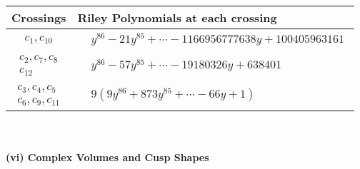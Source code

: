 \documentclass[1p]{elsarticle_modified}
\theoremstyle{definition}
\begin{document}
\begin{tabular}{m{50pt}|m{274pt}}
Crossings & \hspace{64pt}Riley Polynomials at each crossing \\
\hline $$\begin{aligned}c_{1},c_{10}\end{aligned}$$&$\begin{aligned}
&y^{86}-21 y^{85}+\cdots-1166956777638 y+100405963161
\end{aligned}$\\
\hline $$\begin{aligned}c_{2},c_{7},c_{8}\\c_{12}\end{aligned}$$&$\begin{aligned}
&y^{86}-57 y^{85}+\cdots-19180326 y+638401
\end{aligned}$\\
\hline $$\begin{aligned}c_{3},c_{4},c_{5}\\c_{6},c_{9},c_{11}\end{aligned}$$&$\begin{aligned}
&9(9 y^{86}+873 y^{85}+\cdots-66 y+1)
\end{aligned}$\\
\hline
\end{tabular}\\~\\
\newpage\flushleft \textbf{(vi) Complex Volumes and Cusp Shapes}
\end{document}
